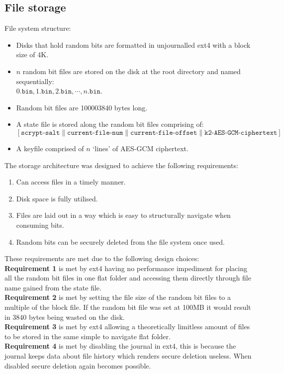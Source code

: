 \documentclass{paper}
\begin{document}
			\subsection{File storage}
				File system structure: \vspace{-0.75em}
				\begin{itemize}
				\setlength\itemsep{-0.3em}
				\item Disks that hold random bits are formatted in unjournalled ext4 with a block size of 4K.
				\item $n$ random bit files are stored on the disk at the root directory and named sequentially:\\
				$0.\texttt{bin}, 1.\texttt{bin}, 2.\texttt{bin}, \cdots , n.\texttt{bin}$.
				\item Random bit files are 100003840 bytes long.
				\item A state file is stored along the random bit files comprising of:\\ $\left[ \texttt{scrypt-salt}\parallel\texttt{current-file-num}\parallel\texttt{current-file-offset}\parallel\texttt{k2-AES-GCM-ciphertext}\right]$ 
				\item A keyfile comprised of $n$ `lines' of AES-GCM ciphertext.
				\end{itemize}
				The storage architecture was designed to achieve the following requirements: \vspace{-0.75em}
				\begin{enumerate}
				\setlength\itemsep{-0.3em}
				\item 	Can access files in a timely manner.
				\item 	Disk space is fully utilised.
				\item 	Files are laid out in a way which is easy to structurally navigate when consuming bits.
				\item 	Random bits can be securely deleted from the file system once used.
				\end{enumerate}
				These requirements are met due to the following design choices:\\
				\textbf{Requirement 1} is met by ext4 having no performance impediment for placing all the random bit files in one flat folder and accessing them directly through file name gained from the state file.\\
				\textbf{Requirement 2} is met by setting the file size of the random bit files to a multiple of the block file. If the random bit file was set at 100MB it would result in 3840 bytes being wasted on the disk.\\
				\textbf{Requirement 3} is met by ext4 allowing a theoretically limitless amount of files to be stored in the same simple to navigate flat folder.\\
				\textbf{Requirement 4} is met by disabling the journal in ext4, this is because the journal keeps data about file history which renders secure deletion useless. When disabled secure deletion again becomes possible.
\end{document}
